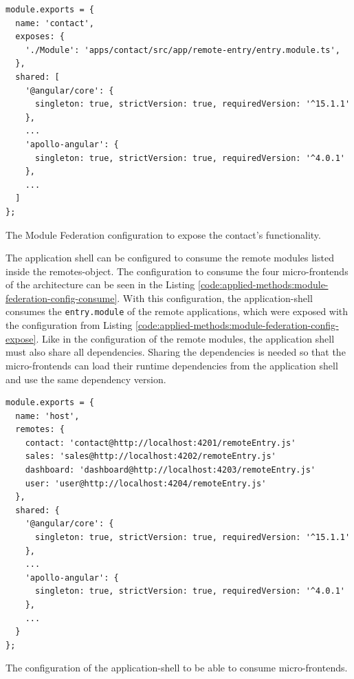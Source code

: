 \ifshowListings
\begin{listing}[H]
    \begin{verbatim}
module.exports = {
  name: 'contact',
  exposes: {
    './Module': 'apps/contact/src/app/remote-entry/entry.module.ts',
  },
  shared: [
    '@angular/core': {
      singleton: true, strictVersion: true, requiredVersion: '^15.1.1' 
    },
    ...
    'apollo-angular': { 
      singleton: true, strictVersion: true, requiredVersion: '^4.0.1' 
    },
    ...
  ]
};
    \end{verbatim}
    \caption{The Module Federation configuration to expose the contact's functionality.}\label{code:applied-methods:module-federation-config-expose}
\end{listing}
\fi

\noindent The application shell can be configured to consume the remote modules listed inside the remotes-object. The configuration to consume the four micro-frontends of the architecture can be seen in the Listing \ref{code:applied-methods:module-federation-config-consume}. With this configuration, the application-shell consumes the \texttt{entry.module} of the remote applications, which were exposed with the configuration from Listing \ref{code:applied-methods:module-federation-config-expose}. Like in the configuration of the remote modules, the application shell must also share all dependencies. Sharing the dependencies is needed so that the micro-frontends can load their runtime dependencies from the application shell and use the same dependency version.

\ifshowListings
\begin{listing}[H]
    \begin{verbatim}
module.exports = {
  name: 'host',
  remotes: {
    contact: 'contact@http://localhost:4201/remoteEntry.js'
    sales: 'sales@http://localhost:4202/remoteEntry.js'
    dashboard: 'dashboard@http://localhost:4203/remoteEntry.js'
    user: 'user@http://localhost:4204/remoteEntry.js'
  },
  shared: {
    '@angular/core': {
      singleton: true, strictVersion: true, requiredVersion: '^15.1.1' 
    },
    ...
    'apollo-angular': { 
      singleton: true, strictVersion: true, requiredVersion: '^4.0.1' 
    },
    ...
  }
};
    \end{verbatim}
    \caption{The configuration of the application-shell to be able to consume micro-frontends.}\label{code:applied-methods:module-federation-config-consume}
\end{listing}
\fi


